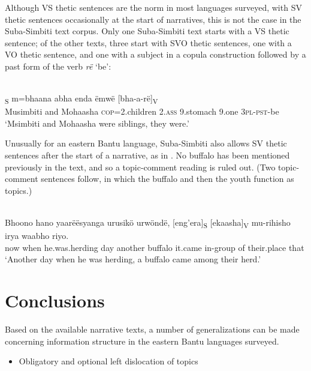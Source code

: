 \documentclass[output=paper]{langsci/langscibook}
\begin{document}
Although VS thetic sentences are the norm in most languages surveyed, with SV thetic sentences occasionally at the start of narratives, this is not the case in the Suba-Simbiti text corpus. Only one Suba-Simbiti text starts with a VS thetic sentence; of the other texts, three start with SVO thetic sentences, one with a VO thetic sentence, and one with a subject in a copula construction followed by a past form of the verb \textit{rë} ‘be’:


\ea\label{ex:29.nicolle}
\\
\textsubscript{S} m=bhaana abha enda ëmwë [bha-a-rë]\textsubscript{V}\\
{\db}Musimbiti and Mohaasha \textsc{cop}=2.children 2.\textsc{ass} 9.stomach 9.one {\db}\textsc{3pl-pst}-be\\
\glt ‘Msimbiti and Mohaasha were siblings, they were.’
\z

Unusually for an eastern Bantu language, Suba-Simbiti also allows SV thetic sentences after the start of a narrative, as in . No buffalo has been mentioned previously in the text, and so a topic-comment reading is ruled out. (Two topic-comment sentences follow, in which the buffalo and then the youth function as topics.)

\ea\label{ex:30.nicolle}
\\
\gll Bhoono hano yaarëësyanga urusikö urwöndë, [eng’era]\textsubscript{S} [ekaasha]\textsubscript{V} mu-rihisho irya waabho riyo.\\
now when he.was.herding day another {\db}buffalo {\db}it.came in-group of their.place that\\
\glt ‘Another day when he was herding, a buffalo came among their herd.’
\z

\section{Conclusions}\label{§6:conclusions.nicolle}

Based on the available narrative texts, a number of generalizations can be made concerning information structure in the eastern Bantu languages surveyed.

\begin{itemize}
\item Obligatory and optional left dislocation of topics
\end{itemize}
\end{document}
